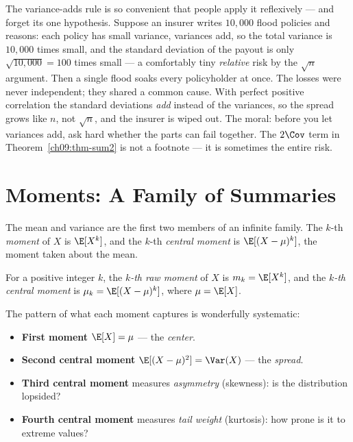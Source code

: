 \begin{paradoxbox}
The variance-adds rule is so convenient that people apply it reflexively ---
and forget its one hypothesis. Suppose an insurer writes $10{,}000$ flood
policies and reasons: each policy has small variance, variances add, so the
total variance is $10{,}000$ times small, and the standard deviation of the
payout is only $\sqrt{10{,}000} = 100$ times small --- a comfortably tiny
\emph{relative} risk by the $\sqrt n$ argument. Then a single flood soaks
every policyholder at once. The losses were never independent; they shared a
common cause. With perfect positive correlation the standard deviations
\emph{add} instead of the variances, so the spread grows like $n$, not
$\sqrt n$, and the insurer is wiped out. The moral: before you let variances
add, ask hard whether the parts can fail together. The $2\Cov$ term in
Theorem~\ref{ch09:thm-sum2} is not a footnote --- it is sometimes the entire
risk.
\end{paradoxbox}

\section{Moments: A Family of Summaries}
\label{ch09:moments}

The mean and variance are the first two members of an infinite family. The
$k$-th \emph{moment} of $X$ is $\E[X^k]$, and the $k$-th \emph{central
moment} is $\E[(X-\mu)^k]$, the moment taken about the mean.

\begin{definition}[Moments]
\label{ch09:def-moments}
For a positive integer $k$, the \emph{$k$-th raw moment} of $X$ is
$m_k = \E[X^k]$, and the \emph{$k$-th central moment} is
$\mu_k = \E[(X-\mu)^k]$, where $\mu = \E[X]$.
\end{definition}

The pattern of what each moment captures is wonderfully systematic:

\begin{itemize}
  \item \textbf{First moment} $\E[X] = \mu$ --- the \emph{center}.
  \item \textbf{Second central moment} $\E[(X-\mu)^2] = \Var(X)$ --- the
        \emph{spread}.
  \item \textbf{Third central moment} measures \emph{asymmetry} (skewness):
        is the distribution lopsided?
  \item \textbf{Fourth central moment} measures \emph{tail weight}
        (kurtosis): how prone is it to extreme values?
\end{itemize}

